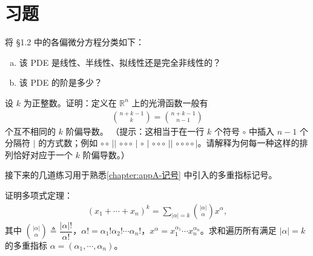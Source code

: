 \documentclass[../../main.tex]{subfiles}
\begin{document}
\section{习题}\label{section:ch01-exercises}

\begin{exercise}\label{exercise:ch01-分类}
将 \S1.2 中的各偏微分方程分类如下：
\begin{enumerate}[(a)]
\item 该 PDE 是线性、半线性、拟线性还是完全非线性的？
\item 该 PDE 的阶是多少？
\end{enumerate}
\end{exercise}

\begin{exercise}\label{exercise:ch01-导数个数}
设 $k$ 为正整数。证明：定义在 $\mathbb{R}^n$ 上的光滑函数一般有
\begin{align*}
\binom{n+k-1}{k}=\binom{n+k-1}{n-1}
\end{align*}
个互不相同的 $k$ 阶偏导数。
（提示：这相当于在一行 $k$ 个符号 $\circ$ 中插入 $n-1$ 个分隔符 $|$ 的方式数；例如 $\circ\circ\,||\,\circ\circ\circ\,|\,\circ\,|\,\circ\circ\circ\,||\,\circ\circ\circ\circ\,|$。请解释为何每一种这样的排列恰好对应于一个 $k$ 阶偏导数。）
\end{exercise}

接下来的几道练习用于熟悉\cref{chapter:appA-记号} 中引入的多重指标记号。

\begin{exercise}\label{exercise:ch01-多项式定理}
证明多项式定理：
\begin{align*}
(x_1+\cdots+x_n)^k=\sum_{|\alpha|=k}\binom{|\alpha|}{\alpha}x^\alpha,
\end{align*}
其中 $\binom{|\alpha|}{\alpha}\triangleq\dfrac{|\alpha|!}{\alpha!}$，$\alpha!=\alpha_1!\alpha_2!\cdots\alpha_n!$，$x^\alpha=x_1^{\alpha_1}\cdots x_n^{\alpha_n}$。求和遍历所有满足 $|\alpha|=k$ 的多重指标 $\alpha=(\alpha_1,\cdots,\alpha_n)$。
\end{exercise}
\end{document}
